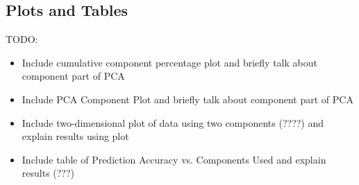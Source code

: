 \documentclass[twocolumn]{article}
\begin{document}
\subsection{Plots and Tables}
\label{subsec:plots}

TODO:
\begin{itemize}
    \item Include cumulative component percentage plot and briefly talk about component part of PCA
    \item Include PCA Component Plot and briefly talk about component part of PCA
    \item Include two-dimensional plot of data using two components (????) and explain results using plot
    \item Include table of Prediction Accuracy vs. Components Used and explain results (???)
\end{itemize}
\end{document}
